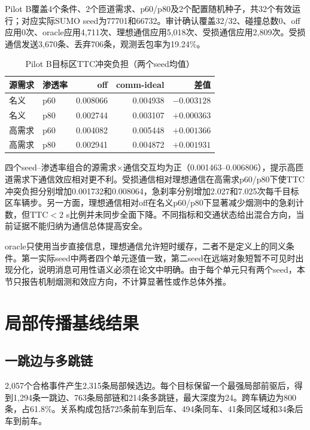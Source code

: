 \documentclass[journal]{IEEEtran}
\begin{document}
Pilot B覆盖4个条件、2个匝道需求、p60/p80及2个配置随机种子，共32个有效运行；对应实际SUMO seed为77701和66732。审计确认覆盖32/32、碰撞总数0、off应用0次、oracle应用4,711次、理想通信应用5,018次、受损通信应用2,809次。受损通信发送3,670条、丢弃706条，观测丢包率为19.24\%。

\begin{table}[!t]
\caption{Pilot B目标区TTC冲突负担（两个seed均值）}
\label{tab:pilot_b}
\centering
\footnotesize
\begin{tabular}{@{}llrrr@{}}
\toprule
源需求 & 渗透率 & off & comm-ideal & 差值\\
\midrule
名义 & p60 & 0.008066 & 0.004938 & $-0.003128$\\
名义 & p80 & 0.002744 & 0.003107 & $+0.000363$\\
高需求 & p60 & 0.004082 & 0.005448 & $+0.001366$\\
高需求 & p80 & 0.002941 & 0.004872 & $+0.001931$\\
\bottomrule
\end{tabular}
\end{table}

四个seed--渗透率组合的源需求$\times$通信交互均为正（0.001463--0.006806），提示高匝道需求下通信效应相对更不利。受损通信相对理想通信在高需求p60/p80下使TTC冲突负担分别增加0.001732和0.008064，急刹率分别增加2.027和7.025次每千目标区车辆步。另一方面，理想通信相对off在名义p60/p80下显著减少烟测中的急刹计数，但TTC$<2$ s比例并未同步全面下降。不同指标和交通状态给出混合方向，当前证据不能归纳为通信总体提高安全。

oracle只使用当步直接信息，理想通信允许短时缓存，二者不是定义上的同义条件。第一实际seed中两者四个单元逐值一致，第二seed在远端对象短暂不可见时出现分化，说明消息可用性语义必须在论文中明确。由于每个单元只有两个seed，本节只报告机制烟测和效应方向，不计算显著性或作总体外推。

\section{局部传播基线结果}\label{sec:local_results}

\subsection{一跳边与多跳链}

2,057个合格事件产生2,315条局部候选边。每个目标保留一个最强局部前驱后，得到1,294条一跳边、763条局部链和214条多跳链，最大深度为24。跨车辆边为800条，占61.8\%。关系构成包括725条前车到后车、494条同车、41条同区域和34条后车到前车。
\end{document}
